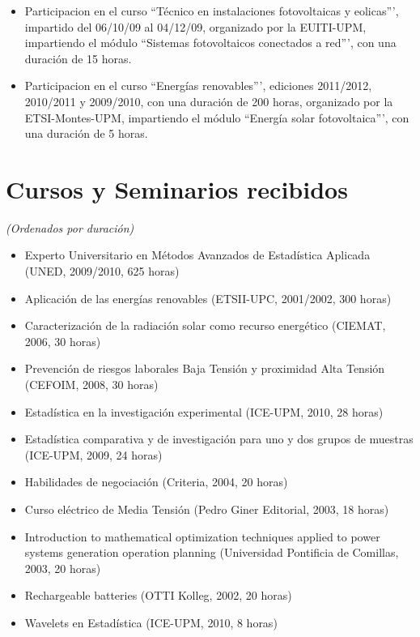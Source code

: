 \documentclass[article, a4paper]{memoir}
\begin{document}
\begin{itemize}
\item Participacion en el curso ``Técnico en instalaciones
fotovoltaicas y eolicas''', impartido del 06/10/09 al 04/12/09,
organizado por la EUITI-UPM, impartiendo el módulo ``Sistemas
fotovoltaicos conectados a red''', con una duración de 15 horas.

\item Participacion en el curso ``Energías renovables''', ediciones
2011/2012, 2010/2011 y 2009/2010, con una duración de 200
horas, organizado por la ETSI-Montes-UPM, impartiendo el módulo
``Energía solar fotovoltaica''', con una duración de 5 horas.
\end{itemize}


\section{Cursos y Seminarios recibidos}
\label{sec-9}

\emph{(Ordenados por duración)}


\begin{itemize}
\item Experto Universitario en Métodos Avanzados de Estadística
Aplicada (UNED, 2009/2010, 625 horas)

\item Aplicación de las energías renovables (ETSII-UPC, 2001/2002, 300
horas)

\item Caracterización de la radiación solar como recurso energético
(CIEMAT, 2006, 30 horas)

\item Prevención de riesgos laborales Baja Tensión y proximidad Alta
Tensión (CEFOIM, 2008, 30 horas)

\item Estadística en la investigación experimental (ICE-UPM, 2010, 28
horas)

\item Estadística comparativa y de investigación para uno y dos grupos
de muestras (ICE-UPM, 2009, 24 horas)

\item Habilidades de negociación (Criteria, 2004, 20 horas)

\item Curso eléctrico de Media Tensión (Pedro Giner Editorial, 2003,
18 horas)

\item Introduction to mathematical optimization techniques applied to
power systems generation operation planning (Universidad
Pontificia de Comillas, 2003, 20 horas)

\item Rechargeable batteries (OTTI Kolleg, 2002, 20 horas)

\item Wavelets en Estadística (ICE-UPM, 2010, 8 horas)
\end{itemize}
\end{document}
